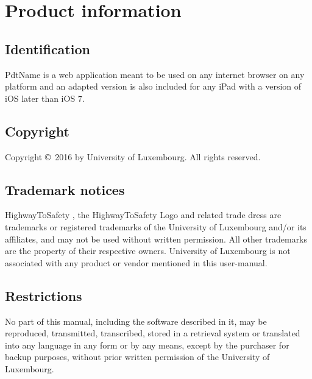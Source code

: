 \chapter{Product information}
\vspace{-6em}


\section{Identification}
\gls{PdtName} is a web application meant to be used on any internet
browser on any platform and an adapted version is also included for any iPad
with a version of iOS later than iOS 7.

\section{Copyright}
Copyright \copyright \ 2016 by University of Luxembourg. All rights reserved.

\section{Trademark notices}
HighwayToSafety \circledR, the HighwayToSafety Logo and related trade dress are
trademarks or registered trademarks of the University of Luxembourg and/or its
affiliates, and may not be used without written permission. All other trademarks
are the property of their respective owners. University of Luxembourg is not
associated with any product or vendor mentioned in this user-manual.

\section{Restrictions}
No part of this manual, including the software described in it, may be
reproduced, transmitted, transcribed, stored in a retrieval system or translated
into any language in any form or by any means, except by the purchaser for
backup purposes, without prior written permission of the University of
Luxembourg.

